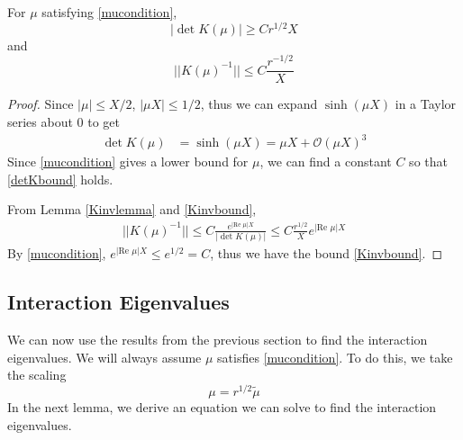 \documentclass[thesis.tex]{subfiles}
\begin{document}
\begin{lemma}\label{Kinvboundslemma}
For $\mu$ satisfying \cref{mucondition},
\begin{equation}\label{detKbound}
|\det K(\mu)| \geq C r^{1/2}X
\end{equation}
and 
\begin{equation}\label{Kinvbound}
||K(\mu)^{-1}|| \leq C \frac{r^{-1/2}}{X}
\end{equation}
\begin{proof}
Since $|\mu| \leq X/2$, $|\mu X| \leq 1/2$, thus we can expand $\sinh(\mu X)$ in a Taylor series about $0$ to get
\begin{align*}
\det K(\mu) &= \sinh(\mu X) = \mu X + \mathcal{O}(\mu X)^3
\end{align*}
Since \cref{mucondition} gives a lower bound for $\mu$, we can find a constant $C$ so that \cref{detKbound} holds. 

From Lemma \ref{Kinvlemma} and \cref{Kinvbound},
\begin{align*}
||K(\mu)^{-1}|| \leq C \frac{e^{|\text{Re }\mu|X }}{| \det K(\mu) |} \leq C \frac{r^{1/2}}{X} e^{|\text{Re }\mu|X }
\end{align*}
By \cref{mucondition}, $e^{|\text{Re }\mu|X } \leq e^{1/2} = C$, thus we have the bound \cref{Kinvbound}.
\end{proof}
\end{lemma}

\subsection{Interaction Eigenvalues}

We can now use the results from the previous section to find the interaction eigenvalues. We will always assume $\mu$ satisfies \cref{mucondition}. To do this, we take the scaling
\[
\mu = r^{1/2}\tilde{\mu}
\]
In the next lemma, we derive an equation we can solve to find the interaction eigenvalues.
\end{document}
